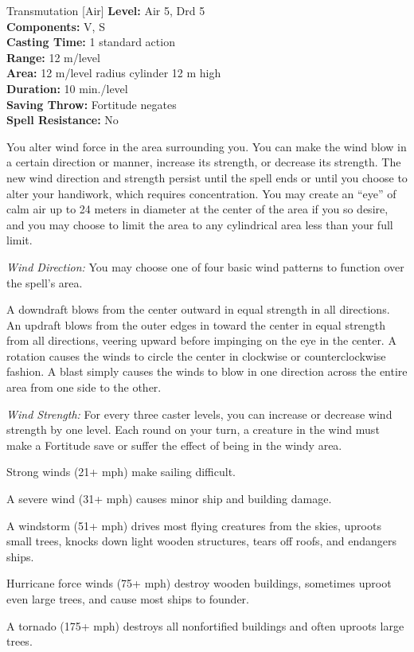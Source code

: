 {Transmutation [Air]}
{
	\textbf{Level:}
	Air 5, Drd 5\\
	\textbf{Components:}
	V, S\\
	\textbf{Casting Time:}
	1 standard action\\
	\textbf{Range:}
	12 m/level\\
	\textbf{Area:}
	12 m/level radius cylinder 12 m high\\
	\textbf{Duration:}
	10 min./level\\
	\textbf{Saving Throw:}
	Fortitude negates\\
	\textbf{Spell Resistance:}
	No\\
}
{
	You alter wind force in the area surrounding you. You can make the wind blow in a certain direction or manner, increase its strength, or decrease its strength. The new wind direction and strength persist until the spell ends or until you choose to alter your handiwork, which requires concentration. You may create an ``eye'' of calm air up to 24 meters in diameter at the center of the area if you so desire, and you may choose to limit the area to any cylindrical area less than your full limit.

	\textit{Wind Direction:}
	You may choose one of four basic wind patterns to function over the spell's area.


A downdraft blows from the center outward in equal strength in all directions.
An updraft blows from the outer edges in toward the center in equal strength from all directions, veering upward before impinging on the eye in the center.
A rotation causes the winds to circle the center in clockwise or counterclockwise fashion.
A blast simply causes the winds to blow in one direction across the entire area from one side to the other.

	\textit{Wind Strength:}
	For every three caster levels, you can increase or decrease wind strength by one level. Each round on your turn, a creature in the wind must make a Fortitude save or suffer the effect of being in the windy area.

	Strong winds (21+ mph) make sailing difficult.

	A severe wind (31+ mph) causes minor ship and building damage.

	A windstorm (51+ mph) drives most flying creatures from the skies, uproots small trees, knocks down light wooden structures, tears off roofs, and endangers ships.

	Hurricane force winds (75+ mph) destroy wooden buildings, sometimes uproot even large trees, and cause most ships to founder.

	A tornado (175+ mph) destroys all nonfortified buildings and often uproots large trees.

}
